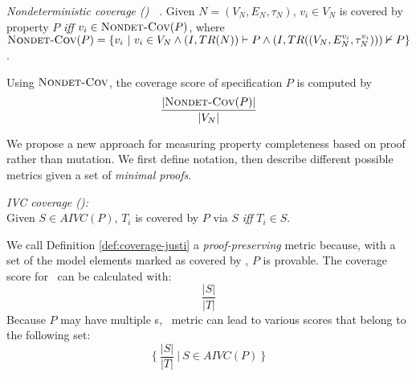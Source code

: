 \begin{definition} {\emph{Nondeterministic coverage (\nondetcov) ~\cite{chockler2010coverage}.} }
\label{def:non-det}
Given $N = (V_N,E_N, \tau_N)$,
$v_i \in V_N$ is covered by property $P$ \emph{iff} $v_i \in \text{\sc Nondet-Cov} (P)$, where
$\text{\sc Nondet-Cov} (P) = \{ v_i~|~ v_i \in V_N \wedge (I, TR(N)) \vdash P \wedge (I, TR((V_N, E^{v_i}_N, \tau^{v_i}_{N}))) \nvdash P \}$.
\end{definition}
Using  $\text{\sc Nondet-Cov}$, the coverage score of specification $P$ is computed by
\[
   \frac{ | \text{\sc Nondet-Cov} (P) |}{|V_N|}
\]


We propose a new approach for measuring property completeness based on proof rather than mutation.  We first define notation, then describe different possible metrics given a set of {\em minimal proofs}.%

\begin{definition} {\emph{IVC coverage (\ivccov):}} \\
\label{def:coverage-justi}
Given $S \in AIVC(P)$, $T_i$ is covered by $P$ via $S$ \emph{iff} $T_i \in S$.
\end{definition}

%
We call Definition \ref{def:coverage-justi} a \emph{proof-preserving} metric because, with a set of the model elements marked as covered by \ivccov, $P$ is provable.
The coverage score for \ivccov\ can be calculated with: $$\frac{|S|}{|T|}$$
Because $P$ may have multiple \mivc s,  \ivccov\ metric can lead to various scores that belong to the following set:
\[
\{~\frac{ |S|}{|T|}~|~S \in AIVC(P)~\}
\]

